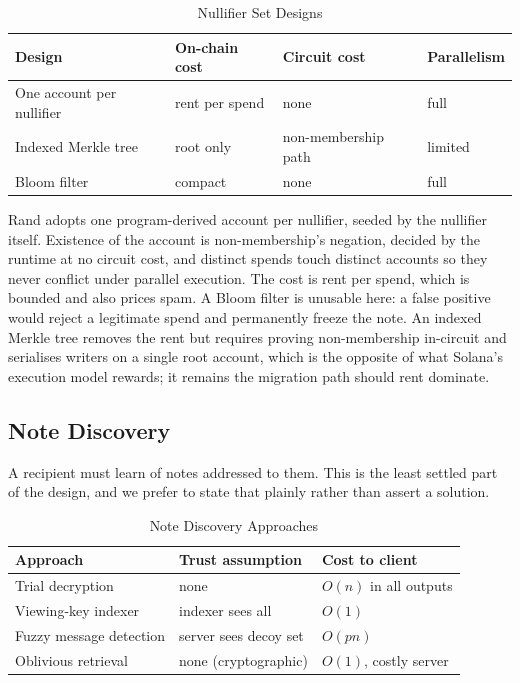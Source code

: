 \documentclass[11pt,a4paper]{article}
\begin{document}
\begin{table}[H]
\centering
\caption{Nullifier Set Designs}
\begin{tabular}{@{}llll@{}}
\toprule
\textbf{Design} & \textbf{On-chain cost} & \textbf{Circuit cost} & \textbf{Parallelism} \\ \midrule
One account per nullifier & rent per spend & none & full \\
Indexed Merkle tree & root only & non-membership path & limited \\
Bloom filter & compact & none & full \\ \bottomrule
\end{tabular}
\end{table}

Rand adopts one program-derived account per nullifier, seeded by the nullifier itself. Existence of the account is non-membership's negation, decided by the runtime at no circuit cost, and distinct spends touch distinct accounts so they never conflict under parallel execution. The cost is rent per spend, which is bounded and also prices spam. A Bloom filter is unusable here: a false positive would reject a legitimate spend and permanently freeze the note. An indexed Merkle tree removes the rent but requires proving non-membership in-circuit and serialises writers on a single root account, which is the opposite of what Solana's execution model rewards; it remains the migration path should rent dominate.

\subsection{Note Discovery}
\label{sec:discovery}

A recipient must learn of notes addressed to them. This is the least settled part of the design, and we prefer to state that plainly rather than assert a solution.

\begin{table}[H]
\centering
\caption{Note Discovery Approaches}
\begin{tabular}{@{}lll@{}}
\toprule
\textbf{Approach} & \textbf{Trust assumption} & \textbf{Cost to client} \\ \midrule
Trial decryption & none & $O(n)$ in all outputs \\
Viewing-key indexer & indexer sees all & $O(1)$ \\
Fuzzy message detection & server sees decoy set & $O(pn)$ \\
Oblivious retrieval & none (cryptographic) & $O(1)$, costly server \\ \bottomrule
\end{tabular}
\end{table}
\end{document}
